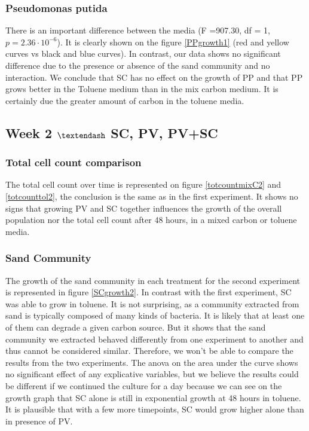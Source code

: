 \documentclass[a4paper, 10pt, conference]{ieeeconf}   %
\begin{document}
\subsubsection{Pseudomonas putida}
There is an important difference between the media (F =907.30, df = 1, $p = 2.36 \cdot 10^{-6}$). It is clearly shown on the figure \ref{PPgrowth1} (red and yellow curves vs black and blue curves).
In contrast, our data shows no significant difference due to the presence or absence of the sand community and no interaction.
We conclude that SC has no effect on the growth of PP and that PP grows better in the Toluene medium than in the mix carbon medium. It is certainly due the greater amount of carbon in the toluene media.



\subsection{Week 2 $\textendash$ SC, PV, PV+SC}

\subsubsection{Total cell count comparison}
The total cell count over time is represented on figure \ref{totcountmixC2} and \ref{totcounttol2}, the conclusion is the same as in the first experiment. It shows no signs that growing PV and SC together influences the growth of the overall population nor the total cell count after 48 hours, in a mixed carbon or toluene media.\newline
\subsubsection{Sand Community}
The growth of the sand community in each treatment for the second experiment is represented in figure \ref{SCgrowth2}.
In contrast with the first experiment, SC was able to grow in toluene. It is not surprising, as a community extracted from sand is typically composed of many kinds of bacteria. It is likely that at least one of them can degrade a given carbon source. But it shows that the sand community we extracted behaved differently from one experiment to another and thus cannot be considered similar. Therefore, we won't be able to compare the results from the two experiments. 
The anova on the area under the curve shows no significant effect of any explicative variables, but we believe the results could be different if we continued the culture for a day because we can see on the growth graph that SC alone is still in exponential growth at 48 hours in toluene. It is plausible that with a few more timepoints, SC would grow higher alone than in presence of PV.\newline
\end{document}

